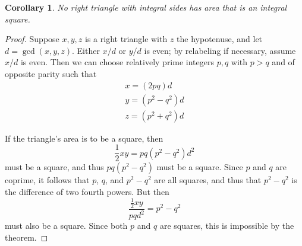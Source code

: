 \documentclass[12pt]{article}
\newtheorem{cor}{Corollary}
\begin{document}
\begin{cor}
No right triangle with integral sides has area that is an integral square.
\end{cor}
\begin{proof}
Suppose $x,y,z$ is a right triangle with $z$ the hypotenuse, and let $d=\gcd(x,y,z)$. Either $x/d$ or $y/d$ is even; by relabeling if necessary, assume $x/d$ is even. Then we can choose relatively prime integers $p,q$ with $p>q$ and of opposite parity such that
\begin{gather*}
x=(2pq)d\\
y=(p^2-q^2)d\\
z=(p^2+q^2)d
\end{gather*}

If the triangle's area is to be a square, then
\[\frac{1}{2}xy=pq(p^2-q^2)d^2\]
must be a square, and thus $pq(p^2-q^2)$ must be a square. Since $p$ and $q$ are coprime, it follows that $p$, $q$, and $p^2-q^2$ are all squares, and thus that $p^2-q^2$ is the difference of two fourth powers. But then
\[\frac{\frac{1}{2}xy}{pqd^2}=p^2-q^2\]
must also be a square. Since both $p$ and $q$ are squares, this is impossible by the theorem.
\end{proof}
\end{document}
